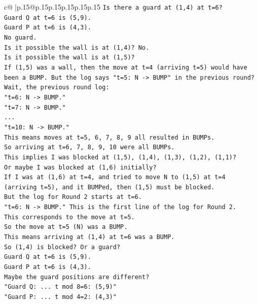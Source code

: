 \documentclass{article}
\begin{document}
{\begin{supertabular}{c@{$\;$}|p{.15\linewidth}@{}p{.15\linewidth}p{.15\linewidth}p{.15\linewidth}p{.15\linewidth}p{.15\linewidth}}
{{{\texttt{Is there a guard at (1,4) at t=6?} \\
\texttt{Guard Q at t=6 is (5,9).} \\
\texttt{Guard P at t=6 is (4,3).} \\
\texttt{No guard.} \\
\texttt{Is it possible the wall is at (1,4)? No.} \\
\texttt{Is it possible the wall is at (1,5)?} \\
\texttt{If (1,5) was a wall, then the move at t=4 (arriving t=5) would have been a BUMP. But the log says "t=5: N {-}> BUMP" in the previous round?} \\
\texttt{Wait, the previous round log:} \\
\texttt{"t=6: N {-}> BUMP."} \\
\texttt{"t=7: N {-}> BUMP."} \\
\texttt{...} \\
\texttt{"t=10: N {-}> BUMP."} \\
\texttt{This means moves at t=5, 6, 7, 8, 9 all resulted in BUMPs.} \\
\texttt{So arriving at t=6, 7, 8, 9, 10 were all BUMPs.} \\
\texttt{This implies I was blocked at (1,5), (1,4), (1,3), (1,2), (1,1)?} \\
\texttt{Or maybe I was blocked at (1,6) initially?} \\
\texttt{If I was at (1,6) at t=4, and tried to move N to (1,5) at t=4 (arriving t=5), and it BUMPed, then (1,5) must be blocked.} \\
\texttt{But the log for Round 2 starts at t=6.} \\
\texttt{"t=6: N {-}> BUMP." This is the first line of the log for Round 2.} \\
\texttt{This corresponds to the move at t=5.} \\
\texttt{So the move at t=5 (N) was a BUMP.} \\
\texttt{This means arriving at (1,4) at t=6 was a BUMP.} \\
\texttt{So (1,4) is blocked? Or a guard?} \\
\texttt{Guard Q at t=6 is (5,9).} \\
\texttt{Guard P at t=6 is (4,3).} \\
\texttt{Maybe the guard positions are different?} \\
\texttt{"Guard Q: ... t mod 8=6: (5,9)"} \\
\texttt{"Guard P: ... t mod 4=2: (4,3)"} \\
}}}
\end{supertabular}}
\end{document}
